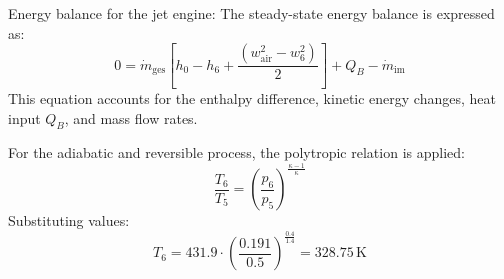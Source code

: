 Energy balance for the jet engine:  
The steady-state energy balance is expressed as:  
\[
0 = \dot{m}_{\text{ges}} \left[ h_0 - h_6 + \frac{(w_{\text{air}}^2 - w_6^2)}{2} \right] + Q_B - \dot{m}_{\text{im}}
\]  
This equation accounts for the enthalpy difference, kinetic energy changes, heat input \( Q_B \), and mass flow rates.  

For the adiabatic and reversible process, the polytropic relation is applied:  
\[
\frac{T_6}{T_5} = \left( \frac{p_6}{p_5} \right)^{\frac{\kappa - 1}{\kappa}}
\]  
Substituting values:  
\[
T_6 = 431.9 \cdot \left( \frac{0.191}{0.5} \right)^{\frac{0.4}{1.4}} = 328.75 \, \text{K}
\]